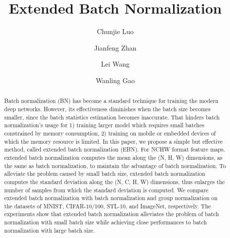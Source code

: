 \documentclass[runningheads]{llncs}
\begin{document}
\pagestyle{headings}
\mainmatter
\def\ECCVSubNumber{4897}  

\title{Extended Batch Normalization} 

\begin{comment}
\titlerunning{ECCV-20 submission ID \ECCVSubNumber} 
\authorrunning{ECCV-20 submission ID \ECCVSubNumber} 
\author{Anonymous ECCV submission}
\institute{Paper ID \ECCVSubNumber}
\end{comment}


\author{Chunjie Luo \and
Jianfeng Zhan \and
Lei Wang \and
Wanling Gao }

\maketitle


\begin{abstract}
Batch normalization (BN) has become a standard technique for training the modern deep networks. However, its effectiveness diminishes when the batch size becomes smaller, since the batch statistics estimation becomes inaccurate. That hinders batch normalization’s usage for 1) training larger model which requires small batches constrained by memory consumption, 2) training on mobile or embedded devices of which the memory resource is limited. 
In this paper, we propose a simple but effective method, called extended batch normalization (EBN).  
For NCHW format feature maps, extended batch normalization computes the mean along the (N, H, W) dimensions, as the same as batch normalization, to maintain the advantage of batch normalization.  To alleviate the problem caused by small batch size, extended batch normalization computes the standard deviation along the (N, C, H, W) dimensions, thus enlarges the number of samples from which the standard deviation is computed. We compare extended batch normalization with batch normalization and group normalization on the datasets of MNIST, CIFAR-10/100, STL-10, and ImageNet, respectively. The experiments show that extended batch normalization alleviates the problem of batch normalization with small batch size while achieving close performances to batch normalization with large batch size.
\end{abstract}
\end{document}
